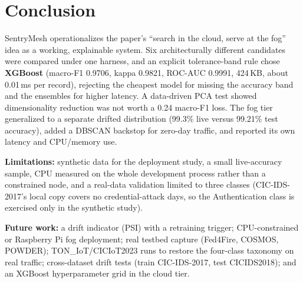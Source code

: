\documentclass[12pt,a4paper]{article}
\begin{document}
\clearpage
\section{Conclusion}
SentryMesh operationalizes the paper's ``search in the cloud, serve at the fog'' idea
as a working, explainable system. Six architecturally different candidates were
compared under one harness, and an explicit tolerance-band rule chose \textbf{XGBoost}
(macro-F1 0.9706, kappa 0.9821, ROC-AUC 0.9991, 424\,KB, about 0.01\,ms per record),
rejecting the cheapest model for missing the accuracy band and the ensembles for
higher latency. A data-driven PCA test showed dimensionality reduction was not worth
a 0.24 macro-F1 loss. The fog tier generalized to a separate drifted distribution
(99.3\% live versus 99.21\% test accuracy), added a DBSCAN backstop for zero-day
traffic, and reported its own latency and CPU/memory use.

\textbf{Limitations:} synthetic data for the deployment study, a small live-accuracy
sample, CPU measured on the whole development process rather than a constrained
node, and a real-data validation limited to three classes (CIC-IDS-2017's local
copy covers no credential-attack days, so the Authentication class is exercised
only in the synthetic study).

\textbf{Future work:} a drift indicator (PSI) with a retraining trigger;
CPU-constrained or Raspberry Pi fog deployment; real testbed capture (Fed4Fire,
COSMOS, POWDER); TON\_IoT/CICIoT2023 runs to restore the four-class taxonomy on real
traffic; cross-dataset drift tests (train CIC-IDS-2017, test CICIDS2018); and an
XGBoost hyperparameter grid in the cloud tier.
\end{document}
